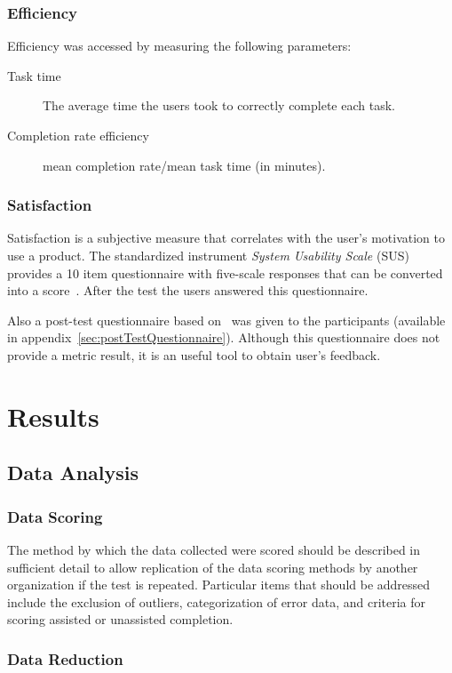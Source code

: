 \documentclass[a4paper]{article}
\begin{document}
 \subsubsection{Efficiency}
 Efficiency was accessed by measuring the following parameters:
\begin{description}  
  \item[Task time] The average time the users took to correctly complete each task.
 \item[Completion rate efficiency] mean completion rate/mean task time (in minutes).
\end{description} 
 
\subsubsection{Satisfaction}
Satisfaction is a subjective measure that correlates with the user's motivation to use a product. The standardized instrument \textit{System Usability Scale} (SUS) provides a 10 item questionnaire with five-scale responses that can be converted into a score~\citep{brooke1996sus}. After the test the users answered this questionnaire. 
 
Also a post-test questionnaire based on~\citep{lawton2004wai_ut} was given to the participants (available in appendix~\ref{sec:postTestQuestionnaire}).
Although this questionnaire does not provide a metric result, it is an useful tool to obtain user's feedback.
 
 
 \section{Results}
 \subsection{Data Analysis}
 \subsubsection{Data Scoring}
 The method by which the data collected were scored should be described in sufficient detail to allow replication of the data scoring methods by another organization if the test is repeated. Particular items that should be addressed include the exclusion of outliers, categorization of error data, and criteria for scoring assisted or unassisted completion.
 
\subsubsection{Data Reduction}
\end{document}
